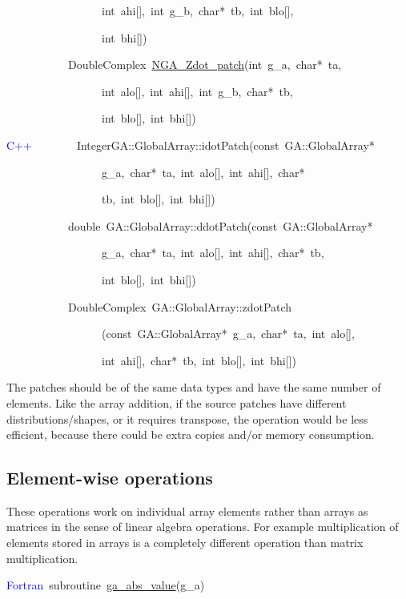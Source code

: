 ~~~~~~~~~~~~~~~~~int~ahi{[}{]},~int~g\_b,~char{*}~tb,~int~blo{[}{]},~

~~~~~~~~~~~~~~~~~int~bhi{[}{]})~

~~~~~~~~~~~DoubleComplex~\href{https://hpc.pnl.gov/globalarrays/api/c_op_api.html\#ga_dot_patch}{NGA\_{}Zdot\_{}patch}(int~g\_a,~char{*}~ta,~

~~~~~~~~~~~~~~~~~int~alo{[}{]},~int~ahi{[}{]},~int~g\_b,~char{*}~tb,~

~~~~~~~~~~~~~~~~~int~blo{[}{]},~int~bhi{[}{]})



\textcolor{blue}{C++~}~~~~~~~IntegerGA::GlobalArray::idotPatch(const~GA::GlobalArray{*}

~~~~~~~~~~~~~~~~~g\_a,~char{*}~ta,~int~alo{[}{]},~int~ahi{[}{]},~char{*}~

~~~~~~~~~~~~~~~~~tb,~int~blo{[}{]},~int~bhi{[}{]})~

~~~~~~~~~~~double~GA::GlobalArray::ddotPatch(const~GA::GlobalArray{*}

~~~~~~~~~~~~~~~~~g\_a,~char{*}~ta,~int~alo{[}{]},~int~ahi{[}{]},~char{*}~tb,~

~~~~~~~~~~~~~~~~~int~blo{[}{]},~int~bhi{[}{]})~

~~~~~~~~~~~DoubleComplex~GA::GlobalArray::zdotPatch

~~~~~~~~~~~~~~~~~(const~GA::GlobalArray{*}~g\_a,~char{*}~ta,~int~alo{[}{]},~

~~~~~~~~~~~~~~~~~int~ahi{[}{]},~char{*}~tb,~int~blo{[}{]},~int~bhi{[}{]})


The patches should be of the same data types and have the same number
of elements. Like the array addition, if the source patches have different
distributions/shapes, or it requires transpose, the operation would
be less efficient, because there could be extra copies and/or memory
consumption. 


\subsection{Element-wise operations }

These operations work on individual array elements rather than arrays
as matrices in the sense of linear algebra operations. For example
multiplication of elements stored in arrays is a completely different
operation than matrix multiplication.

\textcolor{blue}{Fortran}~subroutine~\href{https://hpc.pnl.gov/globalarrays/api/f_op_api.html\#ga_abs_value}{ga\_{}abs\_{}value}(g\_a)~

